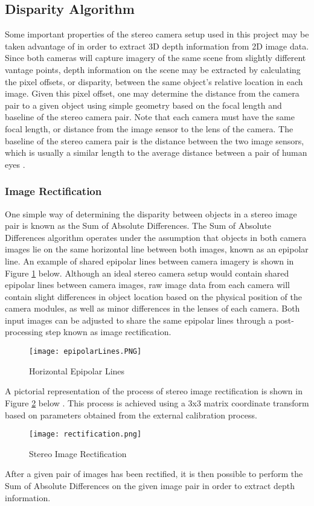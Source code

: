 \subsection{Disparity Algorithm}
Some important properties of the stereo camera setup used in this project may be taken advantage of in order to extract 3D depth information from 2D image data. Since both cameras will capture imagery of the same scene from slightly different vantage points, depth information on the scene may be extracted by calculating the pixel offsets, or disparity, between the same object's relative location in each image. Given this pixel offset, one may determine the distance from the camera pair to a given object using simple geometry based on the focal length and baseline of the stereo camera pair. Note that each camera must have the same focal length, or distance from the image sensor to the lens of the camera. The baseline of the stereo camera pair is the distance between the two image sensors, which is usually a similar length to the average distance between a pair of human eyes  \cite{collins}. 
\subsubsection{Image Rectification} \label{rectsec}One simple way of determining the disparity between objects in a stereo image pair is known as the Sum of Absolute Differences. The Sum of Absolute Differences algorithm operates under the assumption that objects in both camera images lie on the same horizontal line between both images, known as an epipolar line. An example of shared epipolar lines between camera imagery is shown in Figure \ref{epipolarLines} below. Although an ideal stereo camera setup would contain shared epipolar lines between camera images, raw image data from each camera will contain slight differences in object location based on the physical position of the camera modules, as well as minor differences in the lenses of each camera. Both input images can be adjusted to share the same epipolar lines through a post-processing step known as image rectification. 
\par
\begin{figure}[H]
	\centerline{\texttt{[image: epipolarLines.PNG]}}
	\caption{Horizontal Epipolar Lines \cite{collins}}
	\label{epipolarLines}
\end{figure}
\par
A pictorial representation of the process of stereo image rectification is shown in Figure \ref{rectification} below \cite{mattoccia_slides}. This process is achieved using a 3x3 matrix coordinate transform based on parameters obtained from the external calibration process. 
\begin{figure}[H]
	\centerline{\texttt{[image: rectification.png]}}
	\caption{Stereo Image Rectification \cite{mattoccia_slides}}
	\label{rectification}
\end{figure}
\par
After a given pair of images has been rectified, it is then possible to perform the Sum of Absolute Differences on the given image pair in order to extract depth information. 
